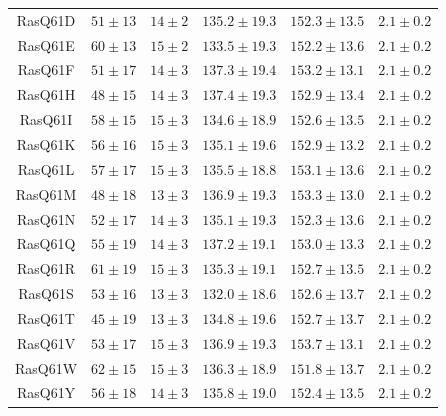 \begin{table}
\begin{tabular}{cccccc}
    RasQ61D  & $51 \pm 13$  &  $14 \pm 2$    &  $135.2 \pm 19.3$ & $152.3 \pm 13.5$  & $2.1 \pm 0.2 $              \\  
    RasQ61E  & $60 \pm 13$  &  $15 \pm 2$    &  $133.5 \pm 19.3$ & $152.2 \pm 13.6$  & $2.1 \pm 0.2 $              \\  
    RasQ61F  & $51 \pm 17$  &  $14 \pm 3$    &  $137.3 \pm 19.4$ & $153.2 \pm 13.1$  & $2.1 \pm 0.2 $              \\  
    RasQ61H  & $48 \pm 15$  &  $14 \pm 3$    &  $137.4 \pm 19.3$ & $152.9 \pm 13.4$  & $2.1 \pm 0.2 $              \\  
    RasQ61I  & $58 \pm 15$  &  $15 \pm 3$    &  $134.6 \pm 18.9$ & $152.6 \pm 13.5$  & $2.1 \pm 0.2 $              \\  
    RasQ61K  & $56 \pm 16$  &  $15 \pm 3$    &  $135.1 \pm 19.6$ & $152.9 \pm 13.2$  & $2.1 \pm 0.2 $              \\  
    RasQ61L  & $57 \pm 17$  &  $15 \pm 3$    &  $135.5 \pm 18.8$ & $153.1 \pm 13.6$  & $2.1 \pm 0.2 $              \\  
    RasQ61M  & $48 \pm 18$  &  $13 \pm 3$    &  $136.9 \pm 19.3$ & $153.3 \pm 13.0$  & $2.1 \pm 0.2 $              \\  
    RasQ61N  & $52 \pm 17$  &  $14 \pm 3$    &  $135.1 \pm 19.3$ & $152.3 \pm 13.6$  & $2.1 \pm 0.2 $              \\  
    RasQ61Q  & $55 \pm 19$  &  $14 \pm 3$    &  $137.2 \pm 19.1$ & $153.0 \pm 13.3$  & $2.1 \pm 0.2 $              \\  
    RasQ61R  & $61 \pm 19$  &  $15 \pm 3$    &  $135.3 \pm 19.1$ & $152.7 \pm 13.5$  & $2.1 \pm 0.2 $              \\  
    RasQ61S  & $53 \pm 16$  &  $13 \pm 3$    &  $132.0 \pm 18.6$ & $152.6 \pm 13.7$  & $2.1 \pm 0.2 $              \\  
    RasQ61T  & $45 \pm 19$  &  $13 \pm 3$    &  $134.8 \pm 19.6$ & $152.7 \pm 13.7$  & $2.1 \pm 0.2 $              \\  
    RasQ61V  & $53 \pm 17$  &  $15 \pm 3$    &  $136.9 \pm 19.3$ & $153.7 \pm 13.1$  & $2.1 \pm 0.2 $              \\  
    RasQ61W  & $62 \pm 15$  &  $15 \pm 3$    &  $136.3 \pm 18.9$ & $151.8 \pm 13.7$  & $2.1 \pm 0.2 $              \\  
    RasQ61Y  & $56 \pm 18$  &  $14 \pm 3$    &  $135.8 \pm 19.0$ & $152.4 \pm 13.5$  & $2.1 \pm 0.2 $              \\  
    
    \bottomrule
    \end{tabular}
    \label{tbl:ras-sasa}
\end{table}

